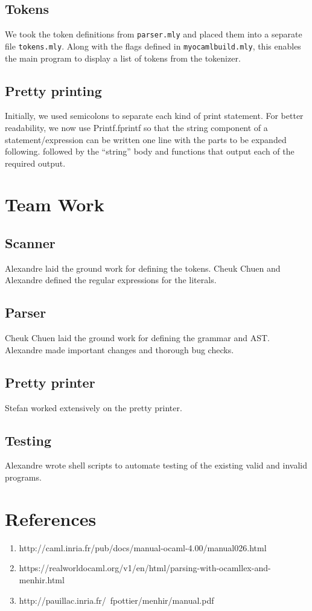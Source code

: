 \documentclass{article}
\begin{document}
\subsection*{Tokens}
We took the token definitions from \verb|parser.mly| and placed them into a separate file \verb|tokens.mly|. Along with the flags defined in \verb|myocamlbuild.mly|, this enables the main program to display a list of tokens from the tokenizer.

\subsection*{Pretty printing}
Initially, we used semicolons to separate each kind of print statement. For better readability, we now use Printf.fprintf so that the string component of a statement/expression can be written one line with the parts to be expanded following.
followed by the ``string'' body and functions that output each of the required output.

\section*{Team Work}
\subsection*{Scanner}
Alexandre laid the ground work for defining the tokens. Cheuk Chuen and Alexandre defined the regular expressions for the literals.

\subsection*{Parser}
Cheuk Chuen laid the ground work for defining the grammar and AST. Alexandre made important changes and thorough bug checks.

\subsection*{Pretty printer}
Stefan worked extensively on the pretty printer.

\subsection*{Testing}
Alexandre wrote shell scripts to automate testing of the existing valid and invalid programs.

\section*{References}
\begin{enumerate}
  \item http://caml.inria.fr/pub/docs/manual-ocaml-4.00/manual026.html
  \item https://realworldocaml.org/v1/en/html/parsing-with-ocamllex-and-menhir.html
  \item http://pauillac.inria.fr/~fpottier/menhir/manual.pdf
\end{enumerate}
\end{document}
